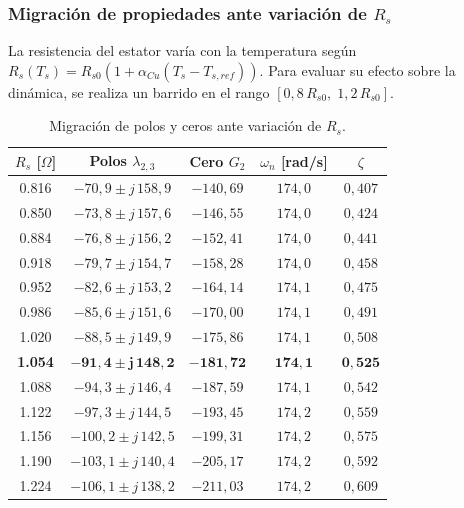 \documentclass[12pt, a4paper,journal, onecolumn, compsoc]{IEEEtran}
\begin{document}
\subsubsection{Migración de propiedades ante variación de \texorpdfstring{$R_s$}{Rs}}
La resistencia del estator varía con la temperatura según $R_s(T_s) = R_{s0}(1 + \alpha_{Cu}(T_s - T_{s,ref}))$. Para evaluar su efecto sobre la dinámica, se realiza un barrido en el rango $[0{,}8\,R_{s0},\; 1{,}2\,R_{s0}]$.

\begin{table}[H]
\centering
\caption{Migración de polos y ceros ante variación de $R_s$.}
\label{tab:migracion_Rs}
\renewcommand{\arraystretch}{1.2}
\footnotesize
\begin{tabular}{|c|c|c|c|c|}
\hline
$R_s$ [$\Omega$] & Polos $\lambda_{2,3}$ & Cero $G_2$ & $\omega_n$ [rad/s] & $\zeta$ \\
\hline
0.816 & $-70{,}9 \pm j\,158{,}9$ & $-140{,}69$ & $174{,}0$ & $0{,}407$ \\
0.850 & $-73{,}8 \pm j\,157{,}6$ & $-146{,}55$ & $174{,}0$ & $0{,}424$ \\
0.884 & $-76{,}8 \pm j\,156{,}2$ & $-152{,}41$ & $174{,}0$ & $0{,}441$ \\
0.918 & $-79{,}7 \pm j\,154{,}7$ & $-158{,}28$ & $174{,}0$ & $0{,}458$ \\
0.952 & $-82{,}6 \pm j\,153{,}2$ & $-164{,}14$ & $174{,}1$ & $0{,}475$ \\
0.986 & $-85{,}6 \pm j\,151{,}6$ & $-170{,}00$ & $174{,}1$ & $0{,}491$ \\
1.020 & $-88{,}5 \pm j\,149{,}9$ & $-175{,}86$ & $174{,}1$ & $0{,}508$ \\
\textbf{1.054} & $\mathbf{-91{,}4 \pm j\,148{,}2}$ & $\mathbf{-181{,}72}$ & $\mathbf{174{,}1}$ & $\mathbf{0{,}525}$ \\
1.088 & $-94{,}3 \pm j\,146{,}4$ & $-187{,}59$ & $174{,}1$ & $0{,}542$ \\
1.122 & $-97{,}3 \pm j\,144{,}5$ & $-193{,}45$ & $174{,}2$ & $0{,}559$ \\
1.156 & $-100{,}2 \pm j\,142{,}5$ & $-199{,}31$ & $174{,}2$ & $0{,}575$ \\
1.190 & $-103{,}1 \pm j\,140{,}4$ & $-205{,}17$ & $174{,}2$ & $0{,}592$ \\
1.224 & $-106{,}1 \pm j\,138{,}2$ & $-211{,}03$ & $174{,}2$ & $0{,}609$ \\
\hline
\end{tabular}
\end{table}
\end{document}
